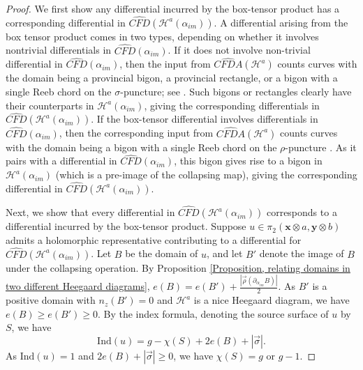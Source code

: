\documentclass{amsart}
\theoremstyle{definition}
\theoremstyle{remark}
\numberwithin{equation}{section}
\numberwithin{equation}{section} \makeatletter
\begin{document}
\begin{proof}
We first show any differential incurred by the box-tensor product has a corresponding differential in $\widehat{CFD}(\mathcal{H}^a(\alpha_{im}))$. A differential arising from the box tensor product comes in two types, depending on whether it involves nontrivial differentials in $\widehat{CFD}(\alpha_{im})$. If it does not involve non-trivial differential in $\widehat{CFD}(\alpha_{im})$, then the input from $\widehat{CFDA}(\mathcal{H}^a)$ counts curves with the domain being a provincial bigon, a provincial rectangle, or a bigon with a single Reeb chord on the $\sigma$-puncture; see \cite[Proposition 8.4]{LOT18}. Such bigons or rectangles clearly have their counterparts in $\mathcal{H}^a(\alpha_{im})$, giving the corresponding differentials in $\widehat{CFD}(\mathcal{H}^a(\alpha_{im}))$. If the box-tensor differential involves differentials in $\widehat{CFD}(\alpha_{im})$, then the corresponding input from  $\widehat{CFDA}(\mathcal{H}^a)$ counts curves with the domain being a bigon with a single Reeb chord on the $\rho$-puncture \cite[Proposition 8.4]{LOT18}. As it pairs with a differential in $\widehat{CFD}(\alpha_{im})$, this bigon gives rise to a bigon in $\mathcal{H}^a(\alpha_{im})$ (which is a pre-image of the collapsing map), giving the corresponding differential in $\widehat{CFD}(\mathcal{H}^a(\alpha_{im}))$.

Next, we show that every differential in $\widehat{CFD}(\mathcal{H}^a(\alpha_{im}))$ corresponds to a differential incurred by the box-tensor product. Suppose $u\in \pi_2(\bm{x}\otimes a, \bm{y}\otimes b)$ admits a holomorphic representative contributing to a differential for $\widehat{CFD}(\mathcal{H}^a(\alpha_{im}))$. Let $B$ be the domain of $u$, and let $B'$ denote the image of $B$ under the collapsing operation. By Proposition \ref{Proposition, relating domains in two different Heegaard diagrams}, $e(B)=e(B')+\frac{|\overrightarrow{\rho}(\partial_{\alpha_{im}}B)|}{2}$. As $B'$ is a positive domain with $n_z(B')=0$ and $\mathcal{H}^a$ is a nice Heegaard diagram, we have $e(B)\geq e(B')\geq 0$. By the index formula, denoting the source surface of $u$ by $S$, we have $$\text{Ind}(u)=g-\chi(S)+2e(B)+|\overrightarrow{\sigma}|.$$ 
As $\text{Ind}(u)=1$ and $2e(B)+|\overrightarrow{\sigma}|\geq 0$, we have $\chi(S)=g$ or $g-1$. 


\end{proof}
\end{document}
